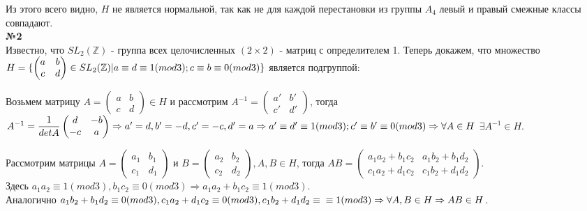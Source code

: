 \documentclass[a4paper, 12pt]{article}
\begin{document}
	Из этого всего видно, $H$ не является нормальной, так как не для каждой перестановки из группы $A_4$ левый и правый смежные классы совпадают. \\
	
	\textbf{№2} \\
	
	Известно, что $SL_2(\mathbb Z)$ - группа всех целочисленных $(2\times2)$ - матриц с определителем 1. Теперь докажем, что множество $H = \{
	\begin{pmatrix}
	a & b \\
	c & d  
	\end{pmatrix} \in SL_2(\mathbb Z) \arrowvert \\ a \equiv d \equiv 1 (mod 3); c \equiv b \equiv 0 (mod 3)\}$ является подгруппой:
	
	Возьмем матрицу
	$A = \begin{pmatrix}
	a & b \\
	c & d  
	\end{pmatrix} \in H$ и рассмотрим $
	A^{-1} = \begin{pmatrix}
	a' & b' \\
	c' & d'  
	\end{pmatrix}$, тогда $A^{-1}= \dfrac{1}{detA}
	\begin{pmatrix}
	d & -b \\
	-c & a  
	\end{pmatrix} \Rightarrow a' = d, b' = -d, c' = -c, d' = a \Rightarrow \\\\
	a' \equiv d' \equiv 1 (mod 3); c' \equiv b' \equiv 0 (mod 3) \Rightarrow \forall A \in H$ $ \exists A^{-1} \in H$.
	
	Рассмотрим матрицы $A = \begin{pmatrix}
	a_1 & b_1 \\
	c_1 & d_1 
	\end{pmatrix}$ и $B = \begin{pmatrix}
	a_2 & b_2 \\
	c_2 & d_2 
	\end{pmatrix}, A, B \in H$, тогда $AB = \begin{pmatrix}
		a_1a_2 + b_1c_2 &  a_1b_2+ b_1d_2 \\
		c_1a_2 + d _1c_2 & c_1b_2 + d_1d_2
	\end{pmatrix}$. \\
	 Здесь $a_1a_2 \equiv 1 (mod 3),
	 b_1c_2 \equiv 0 (mod 3) \Rightarrow a_1a_2 + b_1c_2 \equiv 1 (mod 3)$.\\ 
	 Аналогично $a_1b_2+ b_1d_2 \equiv 0 (mod 3), c_1a_2 + d _1c_2 \equiv 0 (mod 3), c_1b_2 + d_1d_2 \equiv \\ \equiv 1 (mod 3) \Rightarrow \forall A, B \in H \Rightarrow AB \in H$.
	 
\end{document}
